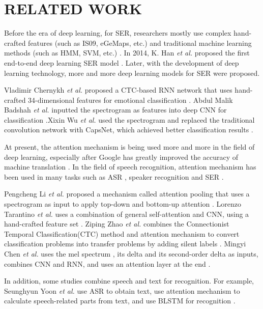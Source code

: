\documentclass[10pt, conference, compsocconf]{IEEEtran}
\begin{document}
\section{RELATED WORK}
Before the era of deep learning, for SER, researchers mostly use complex hand-crafted features (such as IS09, eGeMaps, etc.) and traditional machine learning methods (such as HMM, SVM, etc.) \cite{schuller2003hidden,mower2010framework}. In 2014, K. Han \emph{et al.} proposed the first end-to-end deep learning SER model \cite{han2014speech}. Later, with the development of deep learning technology, more and more deep learning models for SER were proposed.

Vladimir Chernykh \emph{et al.} proposed a CTC-based RNN network that uses hand-crafted 34-dimensional features for emotional classification \cite{chernykh2017emotion}. Abdul Malik Badshah \emph{et al.} inputted the spectrogram as features into deep CNN for classification \cite{badshah2017speech}.Xixin Wu \emph{et al.} used the spectrogram and replaced the traditional convolution network with CapsNet, which achieved better classification results \cite{wu2019speech}. 

At present, the attention mechanism is being used more and more in the field of deep learning, especially after Google has greatly improved the accuracy of machine translation \cite{vaswani2017attention}. In the field of speech recognition, attention mechanism has been used in many tasks such as ASR \cite{pham2019very}, speaker recognition \cite{india2019self} and SER \cite{li2018attention,tarantino2019self,zhao2019attention,chen20183}.

Pengcheng Li \emph{et al.} proposed a mechanism called attention pooling that uses a spectrogram as input to apply top-down and bottom-up attention \cite{li2018attention}. Lorenzo Tarantino \emph{et al.} uses a combination of general self-attention and CNN, using a hand-crafted feature set \cite{tarantino2019self}. Ziping Zhao \emph{et al.} combines the Connectionist Temporal Classification(CTC) method and attention mechanism to convert classification problems into transfer problems by adding silent labels \cite{zhao2019attention}. Mingyi Chen \emph{et al.} uses the mel spectrum , its delta and its second-order delta as inputs, combines CNN and RNN, and uses an attention layer at the end \cite{chen20183}.

In addition, some studies combine speech and text for recognition. For example, Seunghyun Yoon \emph{et al.} use ASR to obtain text, use attention mechanism to calculate speech-related parts from text, and use BLSTM for recognition \cite{yoon2019speech}.
\end{document}
